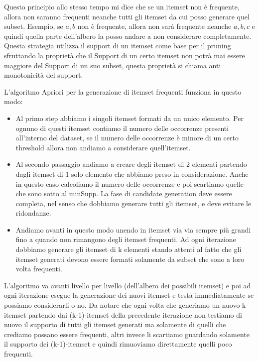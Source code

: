 \documentclass[14pt]{extreport}
\begin{document}
Questo principio allo stesso tempo mi dice che se un itemset non è frequente, allora non saranno frequenti neanche tutti gli itemset da cui posso generare quel subset. Esempio, se ${a,b}$ non è frequente, allora non sarà frequente neanche ${a,b,c}$ e quindi quella parte dell'albero la posso andare a non considerare completamente. Questa strategia utilizza il support di un itemset come base per il pruning sfruttando la proprietà che il Support di un certo itemset non potrà mai essere maggiore del Support di un suo subset, questa proprietà si chiama anti monotonicità del support.

L'algoritmo Apriori per la generazione di itemset frequenti funziona in questo modo:
\begin{itemize}
    \item Al primo step abbiamo i singoli itemset formati da un unico elemento. Per ognuno di questi itemset contiamo il numero delle occorrenze presenti all'interno del dataset, se il numero delle occorrenze è minore di un certo threshold allora non andiamo a considerare quell'itemset.
    \item Al secondo passaggio andiamo a creare degli itemset di 2 elementi partendo dagli itemset di 1 solo elemento che abbiamo preso in considerazione. Anche in questo caso calcoliamo il numero delle occorrenze e poi scartiamo quelle che sono sotto al minSupp.
    La fase di candidate generation deve essere completa, nel senso che dobbiamo generare tutti gli itemset, e deve evitare le ridondanze.
    \item Andiamo avanti in questo modo unendo in itemset via via sempre più grandi fino a quando non rimangono degli itemset frequenti. Ad ogni iterazione dobbiamo generare gli itemset di k elementi stando attenti al fatto che gli itemset generati devono essere formati solamente da subset che sono a loro volta frequenti.
\end{itemize}

L'algoritmo va avanti livello per livello (dell'albero dei possibili itemset) e poi ad ogni iterazione esegue la generazione dei nuovi itemset e testa immediatamente se possiamo considerarli o no.
Da notare che ogni volta che generiamo un nuovo k-itemset partendo dai (k-1)-itemset della precedente iterazione non testiamo di nuovo il supporto di tutti gli itemset generati ma solamente di quelli che crediamo possano essere frequenti, altri invece li scartiamo guardando solamente il supporto dei (k-1)-itemset e quindi rimuoviamo direttamente quelli poco frequenti.
\end{document}
